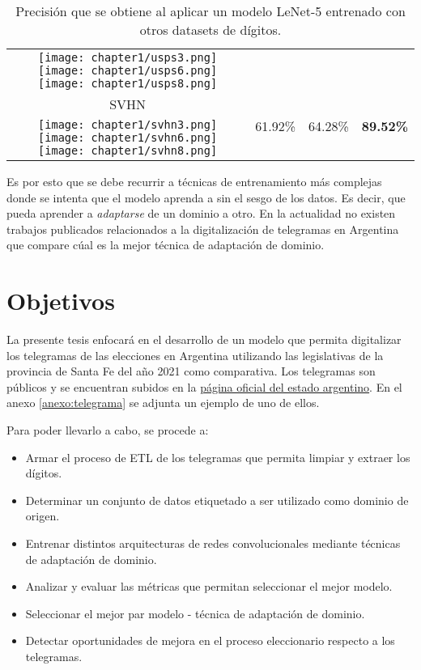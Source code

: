 \begin{table}[ht]
\begin{tabular}{cccc}
        \texttt{[image: chapter1/usps3.png]}
        \texttt{[image: chapter1/usps6.png]}
        \texttt{[image: chapter1/usps8.png]}  &                                                   &                                   &                                   \\
        SVHN                                              & \multirow{2}{*}{61.92\%}                          & \multirow{2}{*}{64.28\%}          & \multirow{2}{*}{\textbf{89.52\%}} \\
        \texttt{[image: chapter1/svhn3.png]}
        \texttt{[image: chapter1/svhn6.png]}
        \texttt{[image: chapter1/svhn8.png]}  &                                                   &                                   &                                   \\
        \bottomrule
    \end{tabular}
    \caption{Precisión que se obtiene al aplicar un modelo LeNet-5 entrenado con otros datasets de dígitos.}
    \label{tab:lenet-distintos-datasets}
\end{table}

Es por esto que se debe recurrir a técnicas de entrenamiento más complejas donde se intenta que el modelo aprenda a sin
el sesgo de los datos. Es decir, que pueda aprender a {\it adaptarse} de un dominio a otro. En la actualidad no existen
trabajos publicados relacionados a la digitalización de telegramas en Argentina que compare cúal es la mejor técnica de
adaptación de dominio.

\section{Objetivos}

La presente tesis enfocará en el desarrollo de un modelo que permita digitalizar los telegramas de las elecciones en
Argentina utilizando las legislativas de la provincia de Santa Fe del año 2021 como comparativa. Los telegramas son
públicos y se encuentran subidos en la \href{https://op.elecciones.gob.ar/telegramas/generales2021/}{página oficial del
    estado argentino}. En el anexo \ref{anexo:telegrama} se adjunta un ejemplo de uno de ellos.

Para poder llevarlo a cabo, se procede a:
\begin{itemize}
    \item Armar el proceso de ETL de los telegramas que permita limpiar y extraer los dígitos.
    \item Determinar un conjunto de datos etiquetado a ser utilizado como dominio de origen.
    \item Entrenar distintos arquitecturas de redes convolucionales mediante técnicas de adaptación de dominio.
    \item Analizar y evaluar las métricas que permitan seleccionar el mejor modelo.
    \item Seleccionar el mejor par modelo - técnica de adaptación de dominio.
    \item Detectar oportunidades de mejora en el proceso eleccionario respecto a los telegramas.
\end{itemize}

